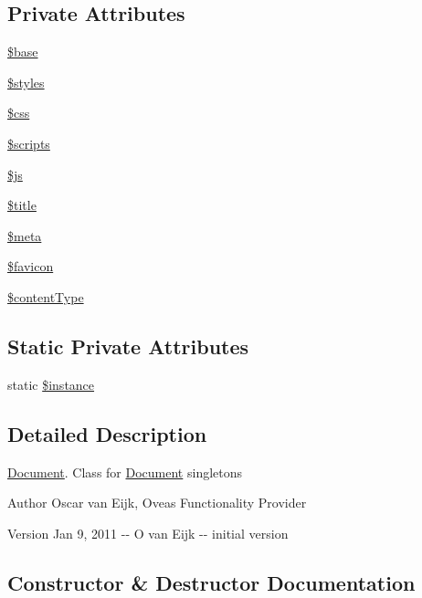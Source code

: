 \subsection*{Private Attributes}
\begin{DoxyCompactItemize}
\item 
\hyperlink{classDocument_a5a5f2c002eaff3b5c0d0c2ef85b3496d}{\$base}
\item 
\hyperlink{classDocument_a5ef42574b069d405190dea3a7d977cb2}{\$styles}
\item 
\hyperlink{classDocument_a635d9d19a754911129ac92e8b00f4f31}{\$css}
\item 
\hyperlink{classDocument_a011e1486a1c78776019df42ed652f6f0}{\$scripts}
\item 
\hyperlink{classDocument_aff8d5c694d27719238793df5c3dbe55f}{\$js}
\item 
\hyperlink{classDocument_a7cd6b0f7a5c8926d8b89e23bee51e7f5}{\$title}
\item 
\hyperlink{classDocument_a4b2a3fc78ec084611daef3343dca3756}{\$meta}
\item 
\hyperlink{classDocument_ad74353c065d3fe06667bc549ed0977e7}{\$favicon}
\item 
\hyperlink{classDocument_ab1cd325e8c6dc65ec0512e759d120b0e}{\$contentType}
\end{DoxyCompactItemize}
\subsection*{Static Private Attributes}
\begin{DoxyCompactItemize}
\item 
static \hyperlink{classDocument_a2699d681667ea5a811ec6da1bf2a5087}{\$instance}
\end{DoxyCompactItemize}


\subsection{Detailed Description}
\hyperlink{classDocument}{Document}. Class for \hyperlink{classDocument}{Document} singletons \begin{DoxyAuthor}{Author}
Oscar van Eijk, Oveas Functionality Provider 
\end{DoxyAuthor}
\begin{DoxyVersion}{Version}
Jan 9, 2011 -\/-\/ O van Eijk -\/-\/ initial version 
\end{DoxyVersion}


\subsection{Constructor \& Destructor Documentation}
